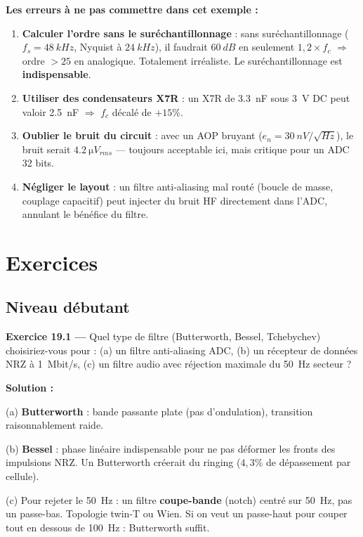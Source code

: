 \documentclass[12pt,a4paper,twoside]{book}
\begin{document}
\begin{attention}
\textbf{Les erreurs à ne pas commettre dans cet exemple :}
\begin{enumerate}[nosep]
\item \textbf{Calculer l'ordre sans le suréchantillonnage} : sans suréchantillonnage ($f_s = \SI{48}{kHz}$, Nyquist à $\SI{24}{kHz}$), il faudrait $\SI{60}{dB}$ en seulement $1{,}2\times f_c$ $\Rightarrow$ ordre $> 25$ en analogique. Totalement irréaliste. Le suréchantillonnage est \textbf{indispensable}.
\item \textbf{Utiliser des condensateurs X7R} : un X7R de \SI{3.3}{nF} sous \SI{3}{V} DC peut valoir \SI{2.5}{nF} $\Rightarrow$ $f_c$ décalé de $+15\%$.
\item \textbf{Oublier le bruit du circuit} : avec un AOP bruyant ($e_n = \SI{30}{nV/\sqrt{Hz}}$), le bruit serait $\SI{4.2}{\micro V_{rms}}$ --- toujours acceptable ici, mais critique pour un ADC 32 bits.
\item \textbf{Négliger le layout} : un filtre anti-aliasing mal routé (boucle de masse, couplage capacitif) peut injecter du bruit HF directement dans l'ADC, annulant le bénéfice du filtre.
\end{enumerate}
\end{attention}

\section*{Exercices}

\subsection*{Niveau débutant}

\textbf{Exercice 19.1 ---} Quel type de filtre (Butterworth, Bessel, Tchebychev) choisiriez-vous pour : (a) un filtre anti-aliasing ADC, (b) un récepteur de données NRZ à \SI{1}{Mbit/s}, (c) un filtre audio avec réjection maximale du \SI{50}{Hz} secteur ?

\begin{pratique}
\textbf{Solution :}

(a) \textbf{Butterworth} : bande passante plate (pas d'ondulation), transition raisonnablement raide.

(b) \textbf{Bessel} : phase linéaire indispensable pour ne pas déformer les fronts des impulsions NRZ. Un Butterworth créerait du ringing ($4{,}3\%$ de dépassement par cellule).

(c) Pour rejeter le \SI{50}{Hz} : un filtre \textbf{coupe-bande} (notch) centré sur \SI{50}{Hz}, pas un passe-bas. Topologie twin-T ou Wien. Si on veut un passe-haut pour couper tout en dessous de \SI{100}{Hz} : Butterworth suffit.
\end{pratique}
\end{document}
